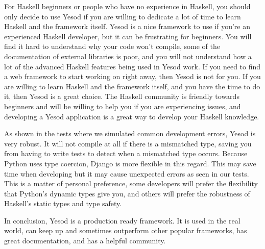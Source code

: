 For Haskell beginners or people who have no experience in Haskell, you should
only decide to use Yesod if you are willing to dedicate a lot of time to learn
Haskell and the framework itself. Yesod is a nice framework to use if you're
an experienced Haskell developer, but it can be frustrating for beginners. You will
find it hard to understand why your code won't compile, some of the documentation
of external libraries is poor, and you will not understand how a lot of the
advanced Haskell features being used in Yesod work. If you need to find a web
framework to start working on right away, then Yesod is not for you. If you are
willing to learn Haskell and the framework itself, and you have the time to do
it, then Yesod is a great choice. The Haskell community is friendly towards
beginners and will be willing to help you if you are experiencing issues, and
developing a Yesod application is a great way to develop your Haskell knowledge.

As shown in the tests where we simulated common development errors, Yesod
is very robust. It will not compile at all if there is a mismatched type,
saving you from having to write tests to detect when a mismatched type
occurs. Because Python uses type coercion, Django is more flexible in
this regard. This may save time when developing but it may cause unexpected
errors as seen in our tests. This is a matter of personal preference, some
developers will prefer the flexibility that Python's dynamic types give
you, and others will prefer the robustness of Haskell's static types
and type safety.

In conclusion, Yesod is a production ready framework. It is used in the real
world, can keep up and sometimes outperform other popular frameworks,
has great documentation, and has a helpful community.
